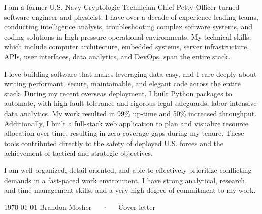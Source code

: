 \documentclass[11pt, a4paper]{coverletter}
\newenvironment{coverletter}{}{}
\newenvironment{paragraphs}{}{}
\begin{document}
\begin{header}
\address{Brooklyn, NY}
\mobile{}
\makeheader[C]
\end{header}
\begin{coverletter}
\begin{opening}
\makeletterstart
\end{opening}
\begin{body}
\setlength{\parindent}{0em}
\setlength{\parskip}{1em}
{\begin{paragraphs}
I am a former U.S. Navy Cryptologic Technician Chief Petty Officer turned software engineer and physicist. I have over a decade of experience leading teams, conducting intelligence analysis, troubleshooting complex software systems, and coding solutions in high-pressure operational environments. My technical skills, which include computer architecture, embedded systems, server infrastructure, APIs, user interfaces, data analytics, and DevOps, span the entire stack.\par
I love building software that makes leveraging data easy, and I care deeply about writing performant, secure, maintainable, and elegant code across the entire stack. During my recent overseas deployment, I built Python packages to automate, with high fault tolerance and rigorous legal safeguards, labor-intensive data analytics. My work resulted in 99\% up-time and 50\% increased throughput. Additionally, I built a full-stack web application to plan and visualize resource allocation over time, resulting in zero coverage gaps during my tenure. These tools contributed directly to the safety of deployed U.S. forces and the achievement of tactical and strategic objectives.\par
I am well organized, detail-oriented, and able to effectively prioritize conflicting demands in a fast-paced work environment. I have strong analytical, research, and time-management skills, and a very high degree of commitment to my work.\par
\end{paragraphs}}
\end{body}
\begin{closing}
\makeletterend
\end{closing}
\begin{enclosures}
\end{enclosures}
\end{coverletter}
\makefooter
{\today}
{Brandon Mosher~~~·~~~Cover letter}
{\thepage}
\end{document}
